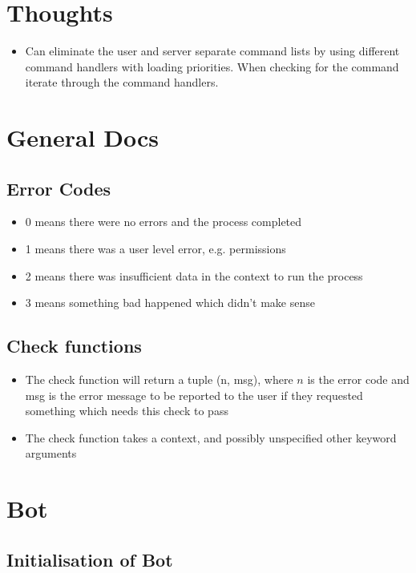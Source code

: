 \documentclass[a4paper]{amsart}
\begin{document}
\section{Thoughts}
\begin{itemize}
    \item Can eliminate the user and server separate command lists by using different command handlers with loading priorities. When checking for the command iterate through the command handlers.
\end{itemize}

\section{General Docs}
\subsection{Error Codes}
\begin{itemize}
    \item 0 means there were no errors and the process completed
    \item 1 means there was a user level error, e.g. permissions
    \item 2 means there was insufficient data in the context to run the process
    \item 3 means something bad happened which didn't make sense
\end{itemize}
\subsection{Check functions}
\begin{itemize}
    \item The check function will return a tuple (n, msg), where $n$ is the error code and msg is the error message to be reported to the user if they requested something which needs this check to pass
    \item The check function takes a context, and possibly unspecified other keyword arguments
\end{itemize}



\section{Bot}

\subsection{Initialisation of Bot}
\end{document}
